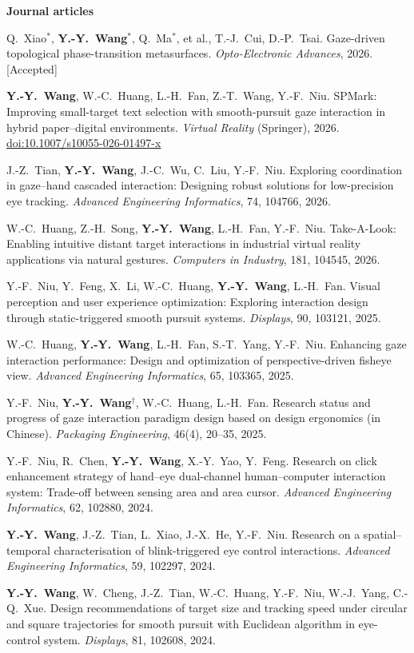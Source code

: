 \documentclass[10pt,a4paper]{article}
\newcommand{\me}{\textbf{Y.-Y.~Wang}}
\newcommand{\status}[1]{{\color{accent}[#1]}}
\begin{document}
\textbf{Journal articles}
\begin{enumerate}[label={[J\arabic*]}]
  \item Q.~Xiao$^{*}$, \me$^{*}$, Q.~Ma$^{*}$, et al., T.-J.~Cui, D.-P.~Tsai.
    Gaze-driven topological phase-transition metasurfaces.
    \textit{Opto-Electronic Advances}, 2026. \status{Accepted}
  \item \me, W.-C.~Huang, L.-H.~Fan, Z.-T.~Wang, Y.-F.~Niu.
    SPMark: Improving small-target text selection with smooth-pursuit gaze interaction in hybrid paper--digital environments.
    \textit{Virtual Reality} (Springer), 2026.
    \href{https://doi.org/10.1007/s10055-026-01497-x}{doi:10.1007/s10055-026-01497-x}
  \item J.-Z.~Tian, \me, J.-C.~Wu, C.~Liu, Y.-F.~Niu.
    Exploring coordination in gaze--hand cascaded interaction: Designing robust solutions for low-precision eye tracking.
    \textit{Advanced Engineering Informatics}, 74, 104766, 2026.
  \item W.-C.~Huang, Z.-H.~Song, \me, L.-H.~Fan, Y.-F.~Niu.
    Take-A-Look: Enabling intuitive distant target interactions in industrial virtual reality applications via natural gestures.
    \textit{Computers in Industry}, 181, 104545, 2026.
  \item Y.-F.~Niu, Y.~Feng, X.~Li, W.-C.~Huang, \me, L.-H.~Fan.
    Visual perception and user experience optimization: Exploring interaction design through static-triggered smooth pursuit systems.
    \textit{Displays}, 90, 103121, 2025.
  \item W.-C.~Huang, \me, L.-H.~Fan, S.-T.~Yang, Y.-F.~Niu.
    Enhancing gaze interaction performance: Design and optimization of perspective-driven fisheye view.
    \textit{Advanced Engineering Informatics}, 65, 103365, 2025.
  \item Y.-F.~Niu, \me$^{\dagger}$, W.-C.~Huang, L.-H.~Fan.
    Research status and progress of gaze interaction paradigm design based on design ergonomics (in Chinese).
    \textit{Packaging Engineering}, 46(4), 20--35, 2025.
  \item Y.-F.~Niu, R.~Chen, \me, X.-Y.~Yao, Y.~Feng.
    Research on click enhancement strategy of hand--eye dual-channel human--computer interaction system: Trade-off between sensing area and area cursor.
    \textit{Advanced Engineering Informatics}, 62, 102880, 2024.
  \item \me, J.-Z.~Tian, L.~Xiao, J.-X.~He, Y.-F.~Niu.
    Research on a spatial--temporal characterisation of blink-triggered eye control interactions.
    \textit{Advanced Engineering Informatics}, 59, 102297, 2024.
  \item \me, W.~Cheng, J.-Z.~Tian, W.-C.~Huang, Y.-F.~Niu, W.-J.~Yang, C.-Q.~Xue.
    Design recommendations of target size and tracking speed under circular and square trajectories for smooth pursuit with Euclidean algorithm in eye-control system.
    \textit{Displays}, 81, 102608, 2024.
\end{enumerate}
\end{document}
